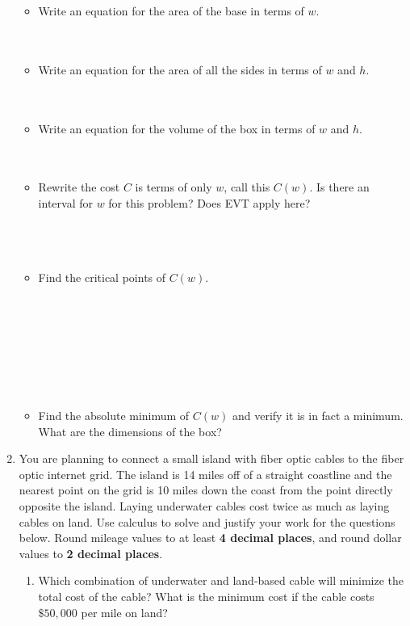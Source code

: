 \documentclass[12pt]{article}
\begin{document}
\begin{enumerate}
\begin{itemize}
        \item Write an equation for the area of the base in terms of $w$.\\\\\\
        
        \item Write an equation for the area of all the sides in terms of $w$ and $h$.\\\\\\

        \item Write an equation for the volume of the box in terms of $w$ and $h$.\\\\\\

        \item Rewrite the cost $C$ is terms of only $w$, call this $C(w)$. Is there an interval for $w$ for this problem? Does EVT apply here?\\\\\\\\

        \item Find the critical points of $C(w)$.\\\\\\\\\\\\\\\\
        
        \item Find the absolute minimum of $C(w)$ and verify it is in fact a minimum. What are the dimensions of the box?
    \end{itemize}

    \newpage
    \item You are planning to connect a small island with fiber optic cables to the fiber optic internet grid. The island is 14 miles off of a straight coastline and the nearest point on the grid is 10 miles down the coast from the point directly opposite the island. Laying underwater cables cost twice as much as laying cables on land. Use calculus to solve and justify your work for the questions below. Round mileage values to at least \textbf{4 decimal places}, and round dollar values to \textbf{2 decimal places}.
    \begin{enumerate}[label=(\alph*)]
        \item Which combination of underwater and land-based cable will minimize the total cost of the cable? What is the minimum cost if the cable costs $\$50,000$ per mile on land?


\end{enumerate}
\end{enumerate}
\end{document}
